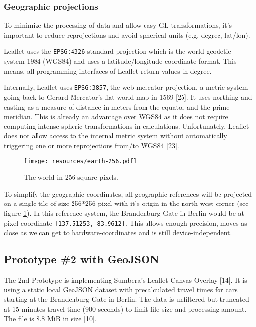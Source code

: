 \documentclass{motivation}
\begin{document}
\subsubsection{Geographic projections}
  \label{sec:pix}
  To minimize the processing of data and allow easy GL-transformations, it's important to reduce reprojections and avoid spherical units (e.g. degree, lat/lon).\par
  Leaflet uses the \texttt{EPSG:4326} standard projection which is the world geodetic system 1984 (WGS84) and uses a latitude/longitude coordinate format. This means, all programming interfaces of Leaflet return values in degree.\par
  Internally, Leaflet uses \texttt{EPSG:3857}, the web mercator projection, a metric system going back to Gerard Mercator's flat world map in 1569 [25]. It uses northing and easting as a measure of distance in meters from the equator and the prime meridian. This is already an advantage over WGS84 as it does not require computing-intense spheric transformations in calculations. Unfortunately, Leaflet does not allow access to the internal metric system without automatically triggering one or more reprojections from/to WGS84 [23].\par

  \begin{figure}[h]
    \centering
    \texttt{[image: resources/earth-256.pdf]}
    \caption{The world in 256 square pixels.}
    \label{fig:earth256}
  \end{figure}

  To simplify the geographic coordinates, all geographic references will be projected on a single tile of size 256*256 pixel with it's origin in the north-west corner (see figure \ref{fig:earth256}). In this reference system, the Brandenburg Gate in Berlin would be at pixel coordinate \texttt{[137.51253, 83.9612]}. This allows enough precision, moves as close as we can get to hardware-coordinates and is still device-independent.

\subsection{Prototype \#2 with GeoJSON}
  \label{sec:pt2}
  The 2nd Prototype is implementing Sumbera's Leaflet Canvas Overlay [14]. It is using a static local GeoJSON dataset with precalculated travel times for cars starting at the Brandenburg Gate in Berlin. The data is unfiltered but truncated at 15 minutes travel time (900 seconds) to limit file size and processing amount. The file is 8.8 MiB in size [10].
\end{document}
